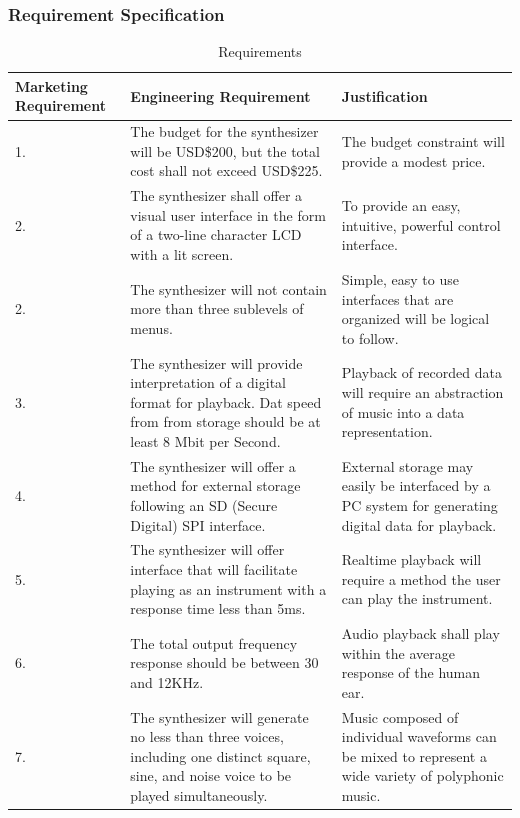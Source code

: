 \documentclass[bibtotocnumbered,abstract=on,paper=a4,fontsize=12pt,parskip=on,halfparskip=on]{scrartcl}		%
\begin{document}
    \subsubsection{Requirement Specification}
    \begin{table}[H]
      \caption{Requirements}
      \vskip 0.3cm
      \begin{tabularx}{\linewidth}{ p{2.0cm} X X }
        \textbf{Marketing Requirement} & \textbf{Engineering Requirement} & \textbf{Justification} \\
          \hline
        1. & The budget for the synthesizer will be USD\$200, but the total cost shall not exceed USD\$225. & The budget constraint will provide a modest price.\\
          \hline
        2. & The synthesizer shall offer a visual user interface in the form of a two-line character LCD with a lit screen. & To provide an easy, intuitive, powerful control interface.\\
          \hline
        2. & The synthesizer will not contain more than three sublevels of menus. & Simple, easy to use interfaces that are organized will be logical to follow.\\
          \hline
        3. & The synthesizer will provide interpretation of a digital format for playback. Dat speed from from storage should be at least 8 Mbit per Second. & Playback of recorded data will require an abstraction of  music into a data representation.\\
          \hline
        4. & The synthesizer will offer a method for external storage following an SD (Secure Digital) SPI interface. & External storage may easily be interfaced by a PC system for generating digital data for playback.\\
          \hline
        5. & The synthesizer will offer interface that will facilitate playing as an instrument with a response time less than 5ms. & Realtime playback will require a method the user can play the instrument.\\
          \hline
        6. & The total output frequency response should be between 30 and 12KHz. & Audio playback shall play within the average response of the human ear.\\
          \hline
        7. & The synthesizer will generate no less than three voices, including one distinct square, sine, and noise voice to be played simultaneously. & Music composed of individual waveforms can be mixed to represent a wide variety of polyphonic music.\\
      \end{tabularx}
      \end{table}
\end{document}
